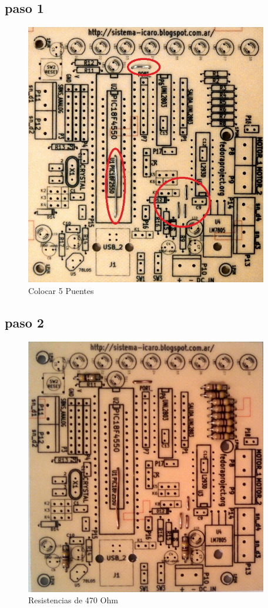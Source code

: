 \documentclass[letterpaper,10pt,english]{sphinxmanual}
\begin{document}
\subsection{paso 1}
\label{np07:paso-1}\begin{figure}[htbp]
\centering
\capstart

\includegraphics[width=300pt]{1b.jpg}
\caption{Colocar 5 Puentes}\end{figure}
\newpage

\subsection{paso 2}
\label{np07:paso-2}\begin{figure}[htbp]
\centering
\capstart

\includegraphics[width=300pt]{2b.jpg}
\caption{Resistencias de 470 Ohm}\end{figure}
\newpage
\end{document}
